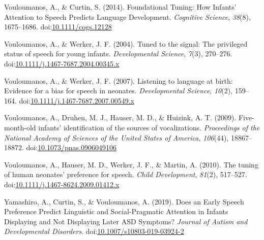 \documentclass[man]{apa6}
\begin{document}
\hypertarget{ref-vouloumanos_foundational_2014}{}
Vouloumanos, A., \& Curtin, S. (2014). Foundational Tuning: How Infants'
Attention to Speech Predicts Language Development. \emph{Cognitive
Science}, \emph{38}(8), 1675--1686.
doi:\href{https://doi.org/10.1111/cogs.12128}{10.1111/cogs.12128}

\hypertarget{ref-vouloumanos_tuned_2004}{}
Vouloumanos, A., \& Werker, J. F. (2004). Tuned to the signal: The
privileged status of speech for young infants. \emph{Developmental
Science}, \emph{7}(3), 270--276.
doi:\href{https://doi.org/10.1111/j.1467-7687.2004.00345.x}{10.1111/j.1467-7687.2004.00345.x}

\hypertarget{ref-vouloumanos_listening_2007}{}
Vouloumanos, A., \& Werker, J. F. (2007). Listening to language at
birth: Evidence for a bias for speech in neonates. \emph{Developmental
Science}, \emph{10}(2), 159--164.
doi:\href{https://doi.org/10.1111/j.1467-7687.2007.00549.x}{10.1111/j.1467-7687.2007.00549.x}

\hypertarget{ref-vouloumanos_five-month-old_2009}{}
Vouloumanos, A., Druhen, M. J., Hauser, M. D., \& Huizink, A. T. (2009).
Five-month-old infants' identification of the sources of vocalizations.
\emph{Proceedings of the National Academy of Sciences of the United
States of America}, \emph{106}(44), 18867--18872.
doi:\href{https://doi.org/10.1073/pnas.0906049106}{10.1073/pnas.0906049106}

\hypertarget{ref-vouloumanos_tuning_2010}{}
Vouloumanos, A., Hauser, M. D., Werker, J. F., \& Martin, A. (2010). The
tuning of human neonates' preference for speech. \emph{Child
Development}, \emph{81}(2), 517--527.
doi:\href{https://doi.org/10.1111/j.1467-8624.2009.01412.x}{10.1111/j.1467-8624.2009.01412.x}

\hypertarget{ref-yamashiro_does_2019}{}
Yamashiro, A., Curtin, S., \& Vouloumanos, A. (2019). Does an Early
Speech Preference Predict Linguistic and Social-Pragmatic Attention in
Infants Displaying and Not Displaying Later ASD Symptoms? \emph{Journal
of Autism and Developmental Disorders}.
doi:\href{https://doi.org/10.1007/s10803-019-03924-2}{10.1007/s10803-019-03924-2}

\endgroup
\end{document}
